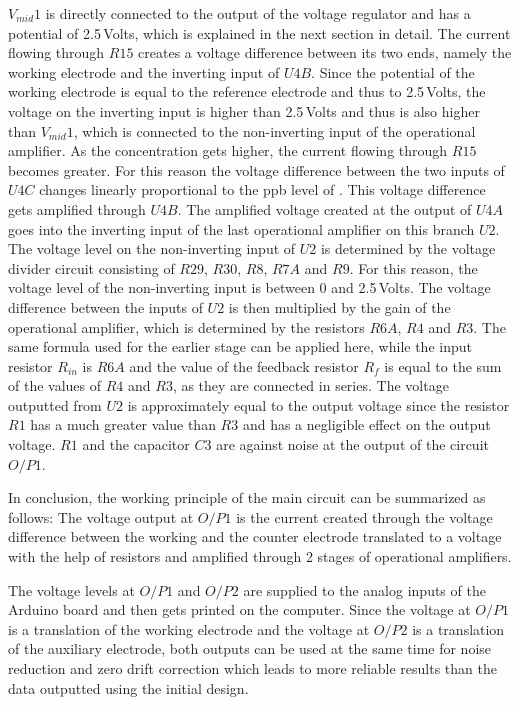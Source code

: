 $V_{mid}1$ is directly connected to the output of the voltage regulator and has a potential of 2.5\,Volts, which is explained in the next section in detail. The current flowing through $R15$ creates a voltage difference between its two ends, namely the working electrode and the inverting input of $U4B$. Since the potential of the working electrode is equal to the reference electrode and thus to 2.5\,Volts, the voltage on the inverting input is higher than 2.5\,Volts and thus is also higher than $V_{mid}1$, which is connected to the non-inverting input of the operational amplifier. As the  concentration gets higher, the current flowing through $R15$ becomes greater. For this reason the voltage difference between the two inputs of $U4C$ changes linearly proportional to the ppb level of . This voltage difference gets amplified through $U4B$. The amplified voltage created at the output of $U4A$ goes into the inverting input of the last operational amplifier on this branch $U2$. The voltage level on the non-inverting input of $U2$ is determined by the voltage divider circuit consisting of $R29$, $R30$, $R8$, $R7A$ and $R9$. For this reason, the voltage level of the non-inverting input is between 0 and 2.5\,Volts. The voltage difference between the inputs of $U2$ is then multiplied by the gain of the operational amplifier, which is determined by the resistors $R6A$, $R4$ and $R3$. The same formula used for the earlier stage can be applied here, while the input resistor $R_{in}$ is $R6A$ and the value of the feedback resistor $R_f$ is equal to the sum of the values of $R4$ and $R3$, as they are connected in series. The voltage outputted from $U2$ is approximately equal to the output voltage since the resistor $R1$ has a much greater value than $R3$ and has a negligible effect on the output voltage. $R1$ and the capacitor $C3$ are against noise at the output of the circuit $O/P1$.\par 
In conclusion, the working principle of the main circuit can be summarized as follows: The voltage output at $O/P1$ is the current created through the voltage difference between the working and the counter electrode translated to a voltage with the help of resistors and amplified through 2 stages of operational amplifiers.\par 
The voltage levels at $O/P1$ and $O/P2$ are supplied to the analog inputs of the Arduino board and then gets printed on the computer. Since the voltage at $O/P1$ is a translation of the working electrode and the voltage at $O/P2$ is a translation of the auxiliary electrode, both outputs can be used at the same time for noise reduction and zero drift correction which leads to more reliable results than the data outputted using the initial design.


